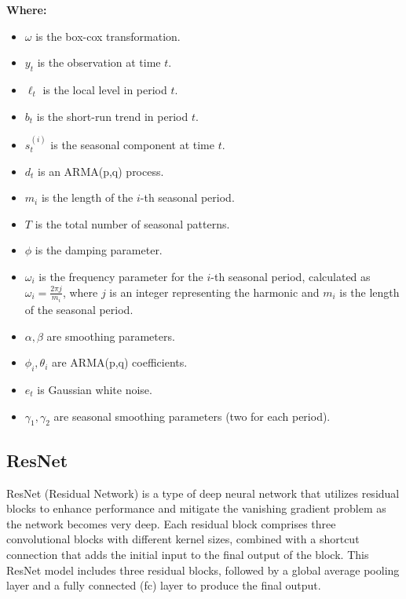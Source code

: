 \documentclass[conference]{IEEEtran}
\begin{document}
\begin{enumerate}
\textbf{Where:}
    \begin{itemize}
        \item  \({\omega}\) is the box-cox transformation.
        \item \( y_{t} \) is the observation at time \( t \).
        \item \( \ell_{t} \) is the local level in period \( t \).
        \item \( b_{t} \) is the short-run trend in period \( t \).
        \item \( s_{t}^{(i)} \) is the seasonal component at time \( t \).
        \item \( d_{t} \) is an ARMA(p,q) process.
        \item \( m_i \) is the length of the \( i \)-th seasonal period.
        \item \( T \) is the total number of seasonal patterns.
        \item \( \phi \) is the damping parameter.
        \item \( \omega_i \) is the frequency parameter for the \( i \)-th seasonal period, calculated as \( \omega_i = \frac{2 \pi j}{m_i} \), where \( j \) is an integer representing the harmonic and \( m_i \) is the length of the seasonal period.
        \item \( \alpha, \beta \) are smoothing parameters.
        \item \( \phi_i, \theta_i \) are ARMA(p,q) coefficients.
        \item \( e_{t} \) is Gaussian white noise.
        \item \( \gamma_1, \gamma_2 \) are seasonal smoothing parameters (two for each period).
    \end{itemize}
\end{enumerate}



\subsection{ResNet}  
ResNet (Residual Network) is a type of deep neural network that utilizes residual blocks to enhance performance and mitigate the vanishing gradient problem as the network becomes very deep. Each residual block comprises three convolutional blocks with different kernel sizes, combined with a shortcut connection that adds the initial input to the final output of the block. This ResNet model includes three residual blocks, followed by a global average pooling layer and a fully connected (fc) layer to produce the final output. \cite{b15}
\end{document}
